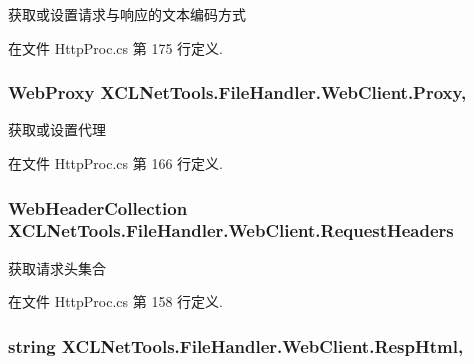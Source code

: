 获取或设置请求与响应的文本编码方式 



在文件 Http\-Proc.\-cs 第 175 行定义.

\hypertarget{class_x_c_l_net_tools_1_1_file_handler_1_1_web_client_ac2f17eefdc2372eb01a6be915d19c0ba}{
\subsubsection[{Proxy}]{\setlength{\rightskip}{0pt plus 5cm}Web\-Proxy X\-C\-L\-Net\-Tools.\-File\-Handler.\-Web\-Client.\-Proxy\hspace{0.3cm}{\ttfamily [get]}, {\ttfamily [set]}}}\label{class_x_c_l_net_tools_1_1_file_handler_1_1_web_client_ac2f17eefdc2372eb01a6be915d19c0ba}


获取或设置代理 



在文件 Http\-Proc.\-cs 第 166 行定义.

\hypertarget{class_x_c_l_net_tools_1_1_file_handler_1_1_web_client_a89d4bf2af70a2a0991904b1b61c8dd1d}{
\subsubsection[{Request\-Headers}]{\setlength{\rightskip}{0pt plus 5cm}Web\-Header\-Collection X\-C\-L\-Net\-Tools.\-File\-Handler.\-Web\-Client.\-Request\-Headers\hspace{0.3cm}{\ttfamily [get]}}}\label{class_x_c_l_net_tools_1_1_file_handler_1_1_web_client_a89d4bf2af70a2a0991904b1b61c8dd1d}


获取请求头集合 



在文件 Http\-Proc.\-cs 第 158 行定义.

\hypertarget{class_x_c_l_net_tools_1_1_file_handler_1_1_web_client_a67e90e96bd067171c16cb84d75f66c3a}{
\subsubsection[{Resp\-Html}]{\setlength{\rightskip}{0pt plus 5cm}string X\-C\-L\-Net\-Tools.\-File\-Handler.\-Web\-Client.\-Resp\-Html\hspace{0.3cm}{\ttfamily [get]}, {\ttfamily [set]}}}\label{class_x_c_l_net_tools_1_1_file_handler_1_1_web_client_a67e90e96bd067171c16cb84d75f66c3a}



